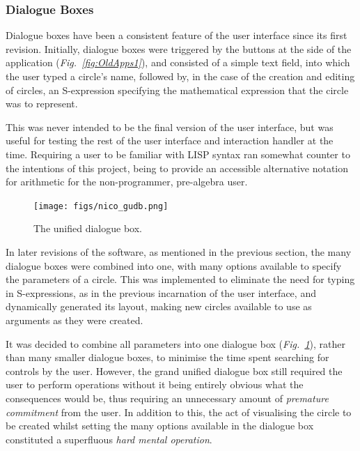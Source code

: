 \documentclass[12pt,twoside,notitlepage,xetex]{report}
\begin{document}
\subsubsection{Dialogue Boxes}

Dialogue boxes have been a consistent feature of the user interface since its first revision.  Initially, dialogue boxes were triggered by the buttons at the side of the application (\emph{Fig.~\ref{fig:OldApps1}}), and consisted of a simple text field, into which the user typed a circle's name, followed by, in the case of the creation and editing of circles, an S-expression specifying the mathematical expression that the circle was to represent.

This was never intended to be the final version of the user interface, but was useful for testing the rest of the user interface and interaction handler at the time.  Requiring a user to be familiar with LISP syntax ran somewhat counter to the intentions of this project, being to provide an accessible alternative notation for arithmetic for the non-programmer, pre-algebra user.

\begin{center}
\begin{figure}[H]
\begin{center}
\texttt{[image: figs/nico\_gudb.png]}
\end{center}
\caption{The unified dialogue box.}
\label{fig:GUDB}
\end{figure}
\end{center}

In later revisions of the software, as mentioned in the previous section, the many dialogue boxes were combined into one, with many options available to specify the parameters of a circle.  This was implemented to eliminate the need for typing in S-expressions, as in the previous incarnation of the user interface, and dynamically generated its layout, making new circles available to use as arguments as they were created.

It was decided to combine all parameters into one dialogue box (\emph{Fig.~\ref{fig:GUDB}}), rather than many smaller dialogue boxes, to minimise the time spent searching for controls by the user.  However, the grand unified dialogue box still required the user to perform operations without it being entirely obvious what the consequences would be, thus requiring an unnecessary amount of \emph{premature commitment} from the user.  In addition to this, the act of visualising the circle to be created whilst setting the many options available in the dialogue box constituted a superfluous \emph{hard mental operation}.
\end{document}

